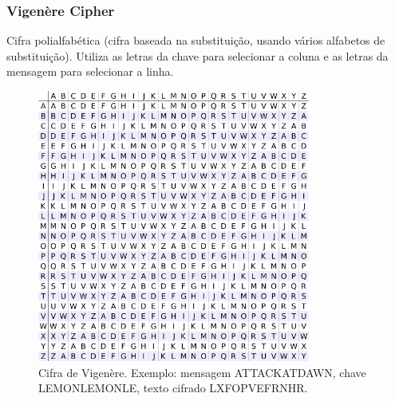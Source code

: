 \begin{frame}
\frametitle{Vigenère Cipher}

Cifra polialfabética (cifra baseada na substituição, usando vários alfabetos de substituição).
Utiliza as letras da chave para selecionar a coluna e as letras da mensagem para selecionar a linha.

\begin{figure}[h]
\centering
\includegraphics[width=0.8\textwidth,height=0.7\textheight,keepaspectratio]{figures/vigenere.png}
\caption{Cifra de Vigenère. Exemplo: mensagem ATTACKATDAWN, chave LEMONLEMONLE, texto cifrado LXFOPVEFRNHR.}
\label{fig-vigenere}
\end{figure}

\end{frame}


